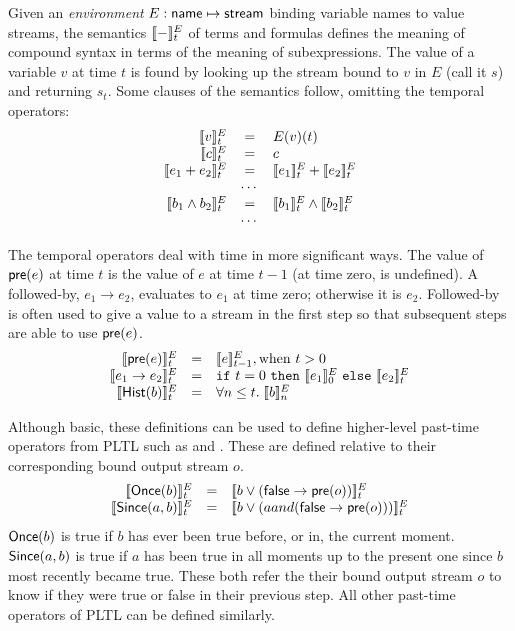 Given an \emph{environment} $E : \mathsf{name} \mapsto \mathsf{stream}$
binding variable names to value streams, the semantics $[\![ - ]\!]^E_t$
of terms and formulas defines the meaning of compound syntax in terms
of the meaning of subexpressions. The value of a variable $v$ at time
$t$ is found by looking up the stream bound to $v$ in $E$ (call it
$s$) and returning $s_t$. Some clauses of the semantics follow,
omitting the temporal operators:
\[
\begin{array}{rcl}
\sem{v}^E_t & = & E(v)(t) \\
\sem{c}^E_t & = & c \\
\sem{e_1 + e_2}^E_t & = & \sem{e_1}^E_t + \sem{e_2}^E_t \\
   & \cdots & \\
\sem{b_1 \land b_2}^E_t & = & \sem{b_1}^E_t \land \sem{b_2}^E_t \\
   & \cdots & \\
\end{array}
\]

The temporal operators deal with time in more significant ways. The
value of $\mathsf{pre}(e)$ at time $t$ is the value of $e$ at time
$t-1$ (at time zero,  is undefined).  
A followed-by, $e_1 \to e_2$, evaluates to $e_1$ at time zero; otherwise it is $e_2$.
Followed-by is often used to give a value to a stream in the first step so that subsequent steps are able to use $\mathsf{pre}(e)$.
\[
\begin{array}{rcl}
\sem{\konst{pre}(e)}^E_t & = & \sem{e}^E_{t-1}, \mathrm{when}\ t > 0 \\
\sem{e_1 \to e_2}^E_t & = & \itelse{t=0}{\sem{e_1}^E_0}{\sem{e_2}^E_t} \\
\sem{\konst{Hist}(b)}^E_t & = & \forall n \leq t.\; \sem{b}^E_n
\end{array}
\]

Although basic, these definitions can be used to define higher-level
past-time operators from PLTL such as  and .
These are defined relative to their corresponding bound output stream $o$.
\[
   \begin{array}{rcl}
      \sem{\konst{Once}(b)}^E_t & = & \sem{b \vee (\konst{false} \to \konst{pre}(o))}^E_t \\
      \sem{\konst{Since}(a, b)}^E_t & = & \sem{b \vee (a and (\konst{false} \to \konst{pre}(o)))}^E_t \\
   \end{array}
\]
$\mathsf{Once}(b)$ is true if $b$ has ever been true before, or in, the current moment.
$\mathsf{Since}(a, b)$ is true if $a$ has been true in all moments up to the present one since $b$ most recently became true.
These both refer the their bound output stream $o$ to know if they were true or false in their previous step.
All other past-time operators of PLTL can be defined similarly.